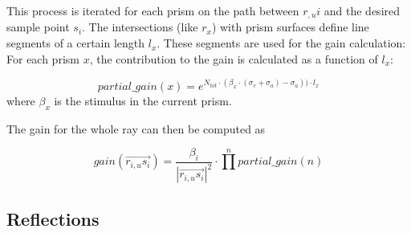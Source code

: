 This process is iterated for each prism on the path between $r_{,u}i$ and the
desired sample point $s_i$. The intersections (like $r_x$) with prism surfaces
define line segments of a certain length $l_x$. These segments are used for the
gain calculation: For each prism $x$, the contribution to the gain is calculated
as a function of $l_x$:

\begin{equation}
\label{eq:partial_gain}
  partial\_gain(x) = 
  e^{N_{tot} \cdot (\beta_x \cdot (\sigma_e + \sigma_a) - \sigma_a)) \cdot l_x}
\end{equation}
where $\beta_x$ is the stimulus in the current
prism.

The gain for the whole ray can then be computed as

\begin{equation}
\label{eq:gain}
  gain(\overrightarrow{r_{i,u}s_i}) =  
  \frac{\beta_i}{ |\overrightarrow{r_{i,u}s_i}|^2} \cdot \prod^npartial\_gain(n) 
\end{equation}



\subsection{Reflections}
\label{subsec:reflections}

